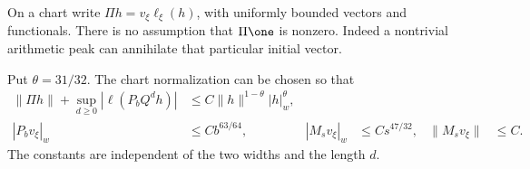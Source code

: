 On a chart write $\Pi h=v_\xi\ell_\xi(h)$, with uniformly bounded
vectors and functionals. There is no assumption that $\Pi\one$ is
nonzero. Indeed a nontrivial arithmetic peak can annihilate that
particular initial vector.

\begin{lemma}
\label{lem:v81-peaks}
Put $\theta=31/32$. The chart normalization can be chosen so that
\begin{align}
 \|\Pi h\|+\sup_{d\ge0}|\ell(P_bQ^dh)|
       &\le C\|h\|^{1-\theta}|h|_w^\theta,
                                              \label{eq:v81-interpolation}\\
 |P_bv_\xi|_w&\le Cb^{63/64},&
 |M_sv_\xi|_w&\le Cs^{47/32},&\|M_sv_\xi\|&\le C.
                                              \label{eq:v81-eigen-local}
\end{align}
The constants are independent of the two widths and the length $d$.
\end{lemma}
